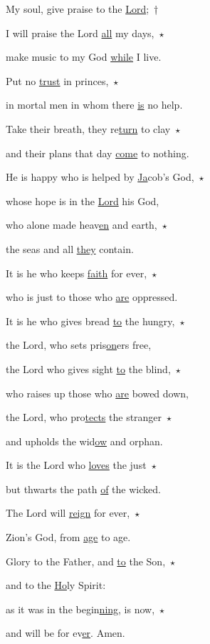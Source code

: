 \noindent My soul, give praise to the \uline{Lord};~†~\nopagebreak

I will praise the Lord \uline{all} my days,~$\star$~\nopagebreak

make music to my God \uline{while} I live.

\noindent Put no \uline{trust} in princes,~$\star$~\nopagebreak

in mortal men in whom there \uline{is} no help.

\noindent Take their breath, they re\uline{turn} to clay~$\star$~\nopagebreak

and their plans that day \uline{come} to nothing.

\noindent He is happy who is helped by \uline{Ja}cob’s God,~$\star$~\nopagebreak

whose hope is in the \uline{Lord} his God,

\noindent who alone made heav\uline{en} and earth,~$\star$~\nopagebreak

the seas and all \uline{they} contain.

\noindent It is he who keeps \uline{faith} for ever,~$\star$~\nopagebreak

who is just to those who \uline{are} oppressed.

\noindent It is he who gives bread \uline{to} the hungry,~$\star$~\nopagebreak

the Lord, who sets pris\uline{on}ers free,

\noindent the Lord who gives sight \uline{to} the blind,~$\star$~\nopagebreak

who raises up those who \uline{are} bowed down,

\noindent the Lord, who pro\uline{tects} the stranger~$\star$~\nopagebreak

and upholds the wid\uline{ow} and orphan.

\noindent It is the Lord who \uline{loves} the just~$\star$~\nopagebreak

but thwarts the path \uline{of} the wicked.

\noindent The Lord will \uline{reign} for ever,~$\star$~\nopagebreak

Zion’s God, from \uline{age} to age.

\noindent Glory to the Father, and \uline{to} the Son,~$\star$~\nopagebreak

and to the \uline{Ho}ly Spirit:

\noindent as it was in the begin\uline{ning}, is now,~$\star$~\nopagebreak

and will be for ev\uline{er}. Amen.

